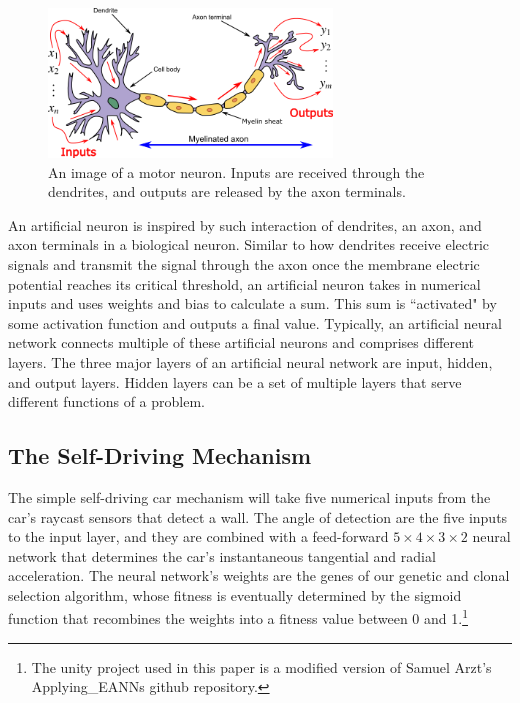 \documentclass[]{interact}
\theoremstyle{plain} %
\theoremstyle{definition}
\theoremstyle{remark}
\begin{document}
\begin{figure}[H]
    \centering
    \includegraphics[height=150px]{img/biological-neuron.png}
    \caption{An image of a motor neuron. Inputs are received through the dendrites, and outputs are released by the axon terminals.}
    \label{fig:biological-neuron}
\end{figure}

An artificial neuron is inspired by such interaction of dendrites, an axon, and axon terminals in a biological neuron. Similar to how dendrites receive electric signals and transmit the signal through the axon once the membrane electric potential reaches its critical threshold, an artificial neuron takes in numerical inputs and uses weights and bias to calculate a sum. This sum is ``activated" by some activation function and outputs a final value. Typically, an artificial neural network connects multiple of these artificial neurons and comprises different layers. The three major layers of an artificial neural network are input, hidden, and output layers. Hidden layers can be a set of multiple layers that serve different functions of a problem.

\subsection{The Self-Driving Mechanism}

The simple self-driving car mechanism will take five numerical inputs from the car's raycast sensors that detect a wall. The angle of detection are the five inputs to the input layer, and they are combined with a feed-forward $5 \times 4 \times 3 \times 2$ neural network that determines the car's instantaneous tangential and radial acceleration. The neural network's weights are the genes of our genetic and clonal selection algorithm, whose fitness is eventually determined by the sigmoid function that  recombines the weights into a fitness value between 0 and 1.\footnote{The unity project used in this paper is a modified version of Samuel Arzt's Applying\_EANNs github repository.}
\end{document}
